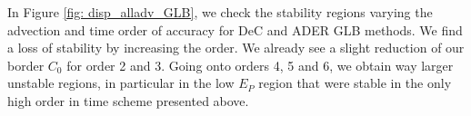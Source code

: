




In Figure \ref{fig: disp_alladv_GLB}, we check the stability regions varying the advection and time order of accuracy for DeC and ADER GLB methods. 
We find a loss of stability by increasing the order. We already see a slight reduction of our border $C_0$ for order 2 and 3. Going onto orders 4, 5 and 6, we obtain way larger unstable regions, in particular in the low $E_P$ region that were stable in the only high order in time scheme presented above.

